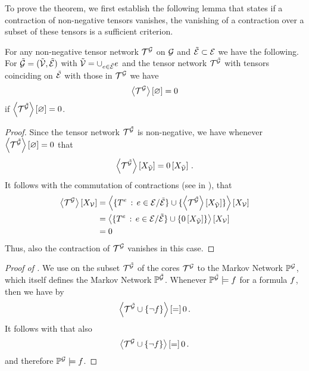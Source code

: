To prove the theorem, we first establish the following lemma that states if a contraction of non-negative tensors vanishes, the vanishing of a contraction over a subset of these tensors is a sufficient criterion.

\begin{lemma}\label{lem:monotocityOfVanishingContractions}
	For any non-negative tensor network $\mathcal{T}^{\mathcal{G}}$ on $\mathcal{G}$ and $\tilde{\mathcal{E}}\subset\mathcal{E}$ we have the following.
	For $\tilde{\mathcal{G}}=(\tilde{\mathcal{V}},\tilde{\mathcal{E}})$ with $\tilde{\mathcal{V}}=\cup_{e\in\tilde{\mathcal{E}}}e$ and the tensor network $\mathcal{T}^{\tilde{\mathcal{G}}}$ with tensors coinciding on $\tilde{\mathcal{E}}$ with those in $\mathcal{T}^{\mathcal{G}}$ we have
	\begin{align*}
		\left\langle \mathcal{T}^{\mathcal{G}}\right\rangle \left[ \varnothing \right] = 0
	\end{align*}
	if $\left\langle \mathcal{T}^{\tilde{\mathcal{G}}}\right\rangle \left[ \varnothing \right]=0$.
\end{lemma}
\begin{proof}
	Since the tensor network $\mathcal{T}^{\tilde{\mathcal{G}}}$ is non-negative, we have whenever $\left\langle \mathcal{T}^{\tilde{\mathcal{G}}}\right\rangle \left[ \varnothing \right]=0$ that
	\begin{align*}
		\left\langle \mathcal{T}^{\tilde{\mathcal{G}}}\right\rangle \left[ X_{\tilde{\mathcal{V}}} \right] = 0\left[X_{\tilde{\mathcal{V}}}\right] \, .
	\end{align*}
	It follows with the commutation of contractions (see  in ), that
	\begin{align*}
		\left\langle \mathcal{T}^{\mathcal{G}}\right\rangle \left[ X_{\mathcal{V}} \right]
		&= \left\langle 
			\{T^{e} \, : \, e\in\mathcal{E}/\tilde{\mathcal{E}}\}
			\cup \{\left\langle \mathcal{T}^{\tilde{\mathcal{G}}}\right\rangle \left[ X_{\tilde{\mathcal{V}}} \right]\}
		\right\rangle \left[ X_{\mathcal{V}} \right] \\
		&= 	\left\langle 
			\{T^{e} \, : \, e\in\mathcal{E}/\tilde{\mathcal{E}}\}
			\cup \{0\left[X_{\tilde{\mathcal{V}}}\right]\}
		\right\rangle \left[ X_{\mathcal{V}} \right] \\
		&= 0
	\end{align*}
	Thus, also the contraction of $\mathcal{T}^{\mathcal{G}}$ vanishes in this case.
\end{proof}

\begin{proof}[Proof of ]
	We use  on the subset $\mathcal{T}^{\tilde{\mathcal{G}}}$ of the cores $\mathcal{T}^{\mathcal{G}}$ to the Markov Network $\mathbb{P}^{\mathcal{G}}$, which itself defines the Markov Network $\mathbb{P}^{\tilde{\mathcal{G}}}$.
	Whenever $\mathbb{P}^{\tilde{\mathcal{G}}}\models f$ for a formula $f$, then we have by 
	\begin{align*}
		\left\langle \mathcal{T}^{\tilde{\mathcal{G}}} \cup\{\lnot f\}\right\rangle \left[ = \right] 0 \, .
	\end{align*}
	It follows with  that also
	\begin{align*}
		\left\langle \mathcal{T}^{\mathcal{G}} \cup\{\lnot f\}\right\rangle \left[ = \right] 0 \, .
	\end{align*}
	and therefore $\mathbb{P}^{\mathcal{G}}\models f$.
\end{proof}


